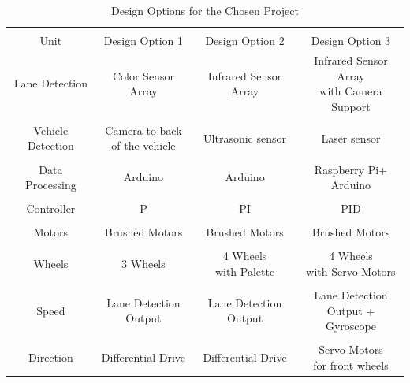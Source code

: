 \documentclass[a4paper,12pt]{article}
\begin{document}
	\begin{table}[H]
  \centering
 
    \begin{tabular}{| c | c | c | c |}
    	\hline 
    	&&& \\
    	Unit & Design Option 1 & Design Option 2  & Design Option 3 \\ \hline
       Lane Detection  & Color Sensor Array & Infrared Sensor Array & \specialcell{ Infrared Sensor  Array \\ with  Camera Support}  \\ 
       & & & \\
       Vehicle Detection &   \specialcell{Camera to back \\of the vehicle }  & Ultrasonic sensor & Laser sensor   \\
       &&& \\ 
       Data Processing & Arduino & Arduino & \specialcell{Raspberry Pi+\\Arduino} \\ 
       &&& \\
       Controller & P & PI & PID \\ 
       &&&  \\
       Motors & Brushed Motors & Brushed Motors & Brushed Motors \\
       &&& \\
		Wheels & 3 Wheels  &  \specialcell{4 Wheels \\with Palette}  & \specialcell{4 Wheels \\with Servo Motors}   \\
		&&& \\
		Speed & \specialcell{Lane Detection \\Output} &  \specialcell{Lane Detection \\Output} & \specialcell{Lane Detection \\Output +  Gyroscope }   \\
		&&&\\
		Direction & Differential Drive  & Differential Drive & \specialcell{Servo Motors \\ for front wheels}  
       
       
       \\\hline
      
  \end{tabular}
  \caption{Design Options for the Chosen Project}
  \label{tab:designs}
\end{table}			
				
\end{document}
